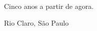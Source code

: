 \cleardoublepage
\thispagestyle{empty}
\begin{center}
\begin{flushright}
Cinco anos a partir de agora.

Rio Claro, São Paulo
\end{flushright}
\vspace*{\fill}
\end{center}
\cleardoublepage
